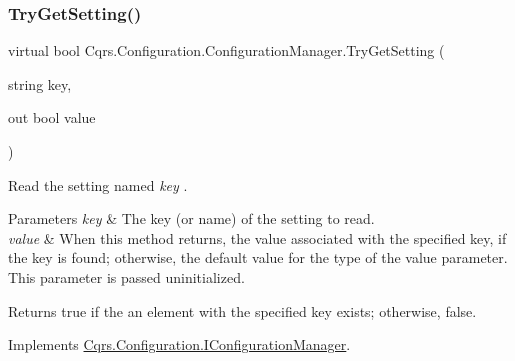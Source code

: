 \subsubsection{\texorpdfstring{Try\+Get\+Setting()}{TryGetSetting()}\hspace{0.1cm}{\footnotesize\ttfamily [2/2]}}
{\footnotesize\ttfamily virtual bool Cqrs.\+Configuration.\+Configuration\+Manager.\+Try\+Get\+Setting (\begin{DoxyParamCaption}\item[{string}]{key,  }\item[{out bool}]{value }\end{DoxyParamCaption})\hspace{0.3cm}{\ttfamily [virtual]}}



Read the setting named {\itshape key} . 


\begin{DoxyParams}{Parameters}
{\em key} & The key (or name) of the setting to read.\\
\hline
{\em value} & When this method returns, the value associated with the specified key, if the key is found; otherwise, the default value for the type of the value parameter. This parameter is passed uninitialized.\\
\hline
\end{DoxyParams}
\begin{DoxyReturn}{Returns}
true if the an element with the specified key exists; otherwise, false.
\end{DoxyReturn}


Implements \hyperlink{interfaceCqrs_1_1Configuration_1_1IConfigurationManager_a8389181330999fcb8e30af4dbb56d35e_a8389181330999fcb8e30af4dbb56d35e}{Cqrs.\+Configuration.\+I\+Configuration\+Manager}.

